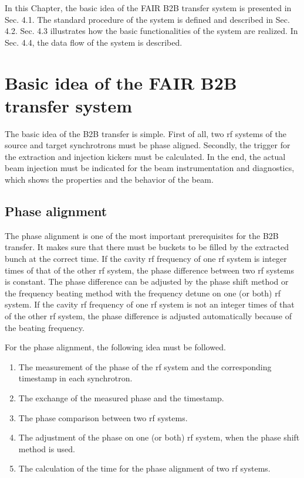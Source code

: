 

In this Chapter, the basic idea of the FAIR B2B transfer system is presented in Sec. 4.1. The standard procedure of the system is defined and described in Sec. 4.2. Sec. 4.3 illustrates how the basic functionalities of the system are realized. In Sec. 4.4, the data flow of the system is described. 

\section{Basic idea of the FAIR B2B transfer system} 
The basic idea of the B2B transfer is simple. First of all, two rf systems of the source and target synchrotrons must be phase aligned. Secondly, the trigger for the extraction and injection kickers must be calculated. In the end, the actual beam injection must be indicated for the beam instrumentation and diagnostics, which shows the properties and the behavior of the beam. 

\subsection{Phase alignment}
The phase alignment is one of the most important prerequisites for the B2B transfer. It makes sure that there must be buckets to be filled by the extracted bunch at the correct time. If the cavity rf frequency of one rf system is integer times of that of the other rf system, the phase difference between two rf systems is constant. The phase difference can be adjusted by the phase shift method or the frequency beating method with the frequency detune on one (or both) rf system. If the cavity rf frequency of one rf system is not an integer times of that of the other rf system, the phase difference is adjusted automatically because of the beating frequency. %

For the phase alignment, the following idea must be followed. 
\begin{enumerate}
\item The measurement of the phase of the rf system and the corresponding timestamp in each synchrotron.
\item The exchange of the measured phase and the timestamp.
\item The phase comparison between two rf systems.
\item The adjustment of the phase on one (or both) rf system, when the phase shift method is used. 
\item The calculation of the time for the phase alignment of two rf systems.
\end{enumerate}
